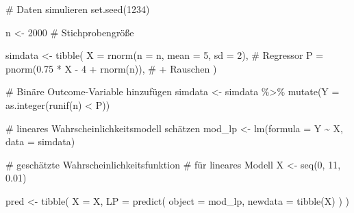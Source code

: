 \documentclass[
  a4paper,
  DIV=11,
  oneside]{scrreprt}
\newenvironment{Shaded}{\begin{snugshade}}{\end{snugshade}}
\newcommand{\AttributeTok}[1]{\textcolor[rgb]{0.40,0.45,0.13}{#1}}
\newcommand{\CommentTok}[1]{\textcolor[rgb]{0.37,0.37,0.37}{#1}}
\newcommand{\DecValTok}[1]{\textcolor[rgb]{0.68,0.00,0.00}{#1}}
\newcommand{\FloatTok}[1]{\textcolor[rgb]{0.68,0.00,0.00}{#1}}
\newcommand{\FunctionTok}[1]{\textcolor[rgb]{0.28,0.35,0.67}{#1}}
\newcommand{\NormalTok}[1]{\textcolor[rgb]{0.00,0.23,0.31}{#1}}
\newcommand{\OtherTok}[1]{\textcolor[rgb]{0.00,0.23,0.31}{#1}}
\newcommand{\SpecialCharTok}[1]{\textcolor[rgb]{0.37,0.37,0.37}{#1}}
\begin{document}
\begin{Shaded}
\begin{Highlighting}[]
\CommentTok{\# Daten simulieren}
\FunctionTok{set.seed}\NormalTok{(}\DecValTok{1234}\NormalTok{)}

\NormalTok{n }\OtherTok{\textless{}{-}} \DecValTok{2000} \CommentTok{\# Stichprobengröße}

\NormalTok{simdata }\OtherTok{\textless{}{-}} \FunctionTok{tibble}\NormalTok{(}
  \AttributeTok{X =} \FunctionTok{rnorm}\NormalTok{(}\AttributeTok{n =}\NormalTok{ n, }\AttributeTok{mean =} \DecValTok{5}\NormalTok{, }\AttributeTok{sd =} \DecValTok{2}\NormalTok{), }\CommentTok{\# Regressor}
  \AttributeTok{P =} \FunctionTok{pnorm}\NormalTok{(}\FloatTok{0.75} \SpecialCharTok{*}\NormalTok{ X }\SpecialCharTok{{-}} \DecValTok{4} \SpecialCharTok{+} \FunctionTok{rnorm}\NormalTok{(n)), }\CommentTok{\# + Rauschen}
\NormalTok{)}

\CommentTok{\# Binäre Outcome{-}Variable hinzufügen}
\NormalTok{simdata }\OtherTok{\textless{}{-}}\NormalTok{ simdata }\SpecialCharTok{\%\textgreater{}\%}
  \FunctionTok{mutate}\NormalTok{(}\AttributeTok{Y =} \FunctionTok{as.integer}\NormalTok{(}\FunctionTok{runif}\NormalTok{(n) }\SpecialCharTok{\textless{}}\NormalTok{ P))}
\end{Highlighting}
\end{Shaded}

\begin{Shaded}
\begin{Highlighting}[]
\CommentTok{\# lineares Wahrscheinlichkeitsmodell schätzen}
\NormalTok{mod\_lp }\OtherTok{\textless{}{-}} \FunctionTok{lm}\NormalTok{(}\AttributeTok{formula =}\NormalTok{ Y }\SpecialCharTok{\textasciitilde{}}\NormalTok{ X, }\AttributeTok{data =}\NormalTok{ simdata)}
\end{Highlighting}
\end{Shaded}

\begin{Shaded}
\begin{Highlighting}[]
\CommentTok{\# geschätzte Wahrscheinlichkeitsfunktion}
\CommentTok{\# für lineares Modell}
\NormalTok{X }\OtherTok{\textless{}{-}} \FunctionTok{seq}\NormalTok{(}\DecValTok{0}\NormalTok{, }\DecValTok{11}\NormalTok{, }\FloatTok{0.01}\NormalTok{)}

\NormalTok{pred }\OtherTok{\textless{}{-}} \FunctionTok{tibble}\NormalTok{(}
  \AttributeTok{X =}\NormalTok{ X, }
  \AttributeTok{LP =} \FunctionTok{predict}\NormalTok{(}
    \AttributeTok{object =}\NormalTok{ mod\_lp, }
    \AttributeTok{newdata =} \FunctionTok{tibble}\NormalTok{(X)}
\NormalTok{  )}
\NormalTok{)}
\end{Highlighting}
\end{Shaded}
\end{document}
